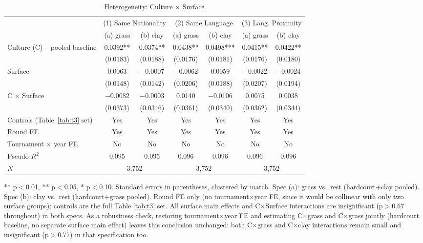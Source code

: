 \documentclass[10pt]{article}
\begin{document}
\begin{table}[htbp]
\color{blue}
\centering
\caption{Heterogeneity: Culture $\times$ Surface \label{tab:t5}}
\begin{threeparttable}
\begin{tabular}{lcccccc}
\toprule
 & \multicolumn{2}{c}{(1) Same Nationality} & \multicolumn{2}{c}{(2) Same Language} & \multicolumn{2}{c}{(3) Lang. Proximity} \\
 & (a) grass & (b) clay & (a) grass & (b) clay & (a) grass & (b) clay \\
\midrule
Culture (C) -- pooled baseline & 0.0392** & 0.0374** & 0.0438** & 0.0498*** & 0.0415** & 0.0422** \\
 & (0.0183) & (0.0188) & (0.0176) & (0.0181) & (0.0176) & (0.0180) \\
Surface & 0.0063 & $-$0.0007 & $-$0.0062 & 0.0059 & $-$0.0022 & $-$0.0024 \\
 & (0.0148) & (0.0142) & (0.0206) & (0.0188) & (0.0207) & (0.0194) \\
C $\times$ Surface & $-$0.0082 & $-$0.0003 & 0.0140 & $-$0.0106 & 0.0075 & 0.0038 \\
 & (0.0373) & (0.0346) & (0.0361) & (0.0340) & (0.0362) & (0.0344) \\
\midrule
Controls (Table~\ref{tab:t3} set) & Yes & Yes & Yes & Yes & Yes & Yes \\
Round FE & Yes & Yes & Yes & Yes & Yes & Yes \\
Tournament $\times$ year FE & No & No & No & No & No & No \\
Pseudo-$R^2$ & 0.095 & 0.095 & 0.096 & 0.096 & 0.096 & 0.096 \\
$N$ & \multicolumn{2}{c}{3,752} & \multicolumn{2}{c}{3,752} & \multicolumn{2}{c}{3,752} \\
\bottomrule
\end{tabular}
\begin{tablenotes}
\small
\item *** p$<$0.01, ** p$<$0.05, * p$<$0.10. Standard errors in parentheses, clustered by match. Spec (a): grass vs.\ rest (hardcourt+clay pooled). Spec (b): clay vs.\ rest (hardcourt+grass pooled). Round FE only (no tournament$\times$year FE, since it would be collinear with only two surface groups); controls are the full Table \ref{tab:t3} set. All surface main effects and C$\times$Surface interactions are insignificant (p$>$0.67 throughout) in both specs. As a robustness check, restoring tournament$\times$year FE and estimating C$\times$grass and C$\times$grass jointly (hardcourt baseline, no separate surface main effect) leaves this conclusion unchanged: both C$\times$grass and C$\times$clay interactions remain small and insignificant (p$>$0.77) in that specification too.
\end{tablenotes}
\end{threeparttable}
\end{table}
\FloatBarrier
\end{document}
